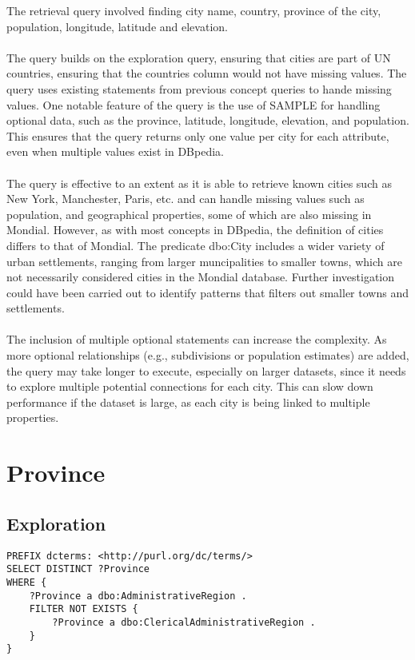\documentclass[11pt]{article}
\begin{document}
The retrieval query involved finding city name, country, province of the city, population, longitude, latitude and elevation.
\\ \\
The query builds on the exploration query, ensuring that cities are part of UN countries, ensuring that the countries column would not have
missing values. The query uses existing statements from previous concept queries to hande missing values. One notable feature of the query is
the use of SAMPLE for handling optional data, such as the province, latitude, longitude, elevation, and population. This ensures that the query
returns only one value per city for each attribute, even when multiple values exist in DBpedia.
\\ \\
The query is effective to an extent as it is able to retrieve known cities such as New York, Manchester, Paris, etc. and  can handle missing values
such as population, and geographical properties, some of which are also missing in Mondial. However, as with most concepts in DBpedia, the definition of cities
differs to that of Mondial. The predicate dbo:City includes a wider variety of urban settlements, ranging from larger muncipalities to smaller towns, which are
not necessarily considered cities in the Mondial database. Further investigation could have been carried out to identify patterns that filters out smaller
towns and settlements.
\\ \\
The inclusion of multiple optional statements can increase the complexity. As more optional relationships (e.g., subdivisions or population estimates) are
added, the query may take longer to execute, especially on larger datasets, since it needs to explore multiple potential connections for each city. This can
slow down performance if the dataset is large, as each city is being linked to multiple properties.

\section{Province}
\subsection{Exploration}
{\footnotesize\begin{verbatim}
PREFIX dcterms: <http://purl.org/dc/terms/>
SELECT DISTINCT ?Province
WHERE {
    ?Province a dbo:AdministrativeRegion .
    FILTER NOT EXISTS {
        ?Province a dbo:ClericalAdministrativeRegion .
    }
}    
\end{verbatim}
}
\end{document}
